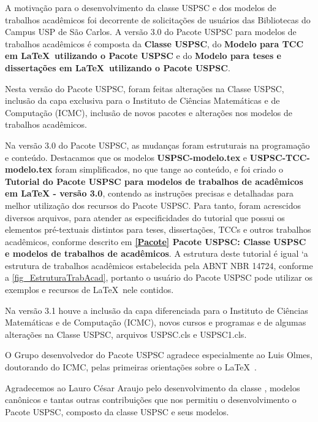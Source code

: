 \begin{agradecimentos}
	A motivação para o desenvolvimento da classe USPSC e dos modelos de trabalhos acad\^emicos foi decorrente de solicitações de usu\'arios das Bibliotecas do Campus USP de São Carlos. A versão 3.0 do Pacote USPSC para modelos de trabalhos acad\^emicos \'e composta da \textbf{Classe USPSC}, do \textbf{Modelo para TCC em \LaTeX\ utilizando o Pacote USPSC} e do \textbf{Modelo para teses e dissertações em \LaTeX\ utilizando o Pacote USPSC}.
	
	Nesta versão do Pacote USPSC, foram feitas alterações na Classe USPSC, inclusão da capa exclusiva para o Instituto de Ci\^encias Matem\'aticas e de Computação (ICMC), inclusão de novos pacotes e alterações nos modelos de trabalhos acad\^emicos.
	
	Na versão 3.0 do Pacote USPSC, as mudanças foram estruturais na programação e conteúdo. Destacamos que os modelos \textbf{USPSC-modelo.tex} e \textbf{USPSC-TCC-modelo.tex} foram simplificados, no que tange ao conteúdo, e foi criado o \textbf{Tutorial do Pacote USPSC para modelos de trabalhos de acad\^emicos em LaTeX - vers\~ao 3.0}, contendo as instruções precisas e detalhadas para melhor utilização dos recursos do Pacote USPSC. Para tanto, foram acrescidos diversos arquivos, para atender as especificidades do tutorial que possui os elementos pr\'e-textuais distintos para teses, dissertações, TCCs e outros trabalhos acad\^emicos, conforme descrito em  \textbf{\ref{Pacote} Pacote USPSC: Classe USPSC e modelos de trabalhos de acad\^emicos}. A estrutura deste tutorial \'e igual `a  estrutura de trabalhos acad\^emicos estabelecida pela ABNT NBR 14724, conforme a \autoref{fig_EstruturaTrabAcad}, portanto o usu\'ario do Pacote USPSC pode utilizar os exemplos e recursos de \LaTeX\ nele contidos.	
	 
	Na versão 3.1 houve a inclusão da capa diferenciada para o Instituto de Ci\^encias Matem\'aticas e de Computação (ICMC), novos cursos e programas e de algumas alterações na Classe USPSC, arquivos USPSC.cls e  USPSC1.cls.
	
	O Grupo desenvolvedor do Pacote USPSC agradece especialmente ao Luis Olmes, doutorando do ICMC, pelas primeiras orientações sobre o \LaTeX\ . 
	
	Agradecemos ao Lauro C\'esar Araujo pelo desenvolvimento da classe  \abnTeX, modelos canônicos e tantas outras contribuições que nos permitiu o desenvolvimento o Pacote USPSC, composto da classe USPSC e seus modelos.
	

\end{agradecimentos}
